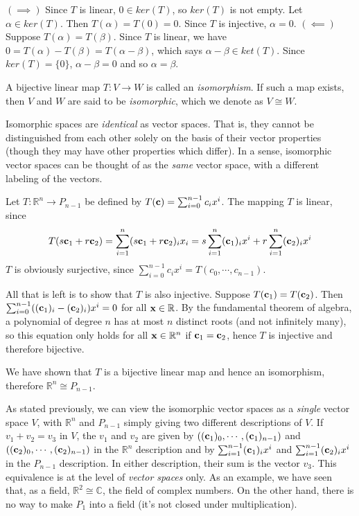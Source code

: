 \documentclass[12pt,letterpaper,reqno]{article}
\numberwithin{equation}{section}
\newcommand{\ti}[1]{\textit{#1}}
\begin{document}
\begin{pf}
$(\implies)$ Since $T$ is linear, $0 \in ker(T)$, so $ker(T)$ is not empty. Let $\alpha \in ker(T)$. Then $T(\alpha)=T(0)=0$. Since $T$ is injective, $\alpha=0$. $(\impliedby)$ Suppose $T(\alpha)=T(\beta)$. Since $T$ is linear, we have $0=T(\alpha)-T(\beta)=T(\alpha-\beta)$, which says $\alpha-\beta \in ket(T)$. Since $ker(T)=\{0\}$, $\alpha-\beta=0$ and so $\alpha=\beta$.	
\end{pf}

\begin{defn}[Isomorphism]
	A bijective linear map $T:V \to W$ is called an \ti{isomorphism}. If such a map exists, then $V$ and $W$ are said to be \ti{isomorphic}, which we denote as $V \cong W$.
\end{defn}

Isomorphic spaces are \ti{identical} as vector spaces. That is, they cannot be distinguished from each other solely on the basis of their vector properties (though they may have other properties which differ). In a sense, isomorphic vector spaces can be thought of as the \ti{same} vector space, with a different labeling of the vectors.

\begin{example}
Let $T:\mathbb{R}^n \to P_{n-1}$ be defined by $T({\bf c})=\sum_{i=0}^{n-1}c_ix^i$. The mapping $T$ is linear, since 
\begin{align*}
T(s{\bf c}_1+r{\bf c}_2)=\sum_{i=1}^n(s{\bf c}_1+r{\bf c}_2)_ix_i=s\sum_{i=1}^n({\bf c}_{1})_i x^i+r\sum_{i=1}^n({\bf c}_{2})_i x^i	
\end{align*}
$T$ is obviously surjective, since $\sum_{i=0}^{n-1}c_ix^i=T(c_0,\cdots,c_{n-1})$.

 All that is left is to show that $T$ is also injective. Suppose $T({\bf c}_1)=T({\bf c}_2)$. Then $\sum_{i=0}^{n-1}(({\bf c}_1)_i-({\bf c}_2)_i)x^i=0$ for all ${\bf x} \in \mathbb{R}$. By the fundamental theorem of algebra, a polynomial of degree $n$ has at most $n$ distinct roots (and not infinitely many), so this equation only holds for all ${\bf x} \in \mathbb{R}^n$ if ${\bf c}_1={\bf c}_2$, hence $T$ is injective and therefore bijective.
 
 We have shown that $T$ is a bijective linear map and hence an isomorphism, therefore $\mathbb{R}^n \cong P_{n-1}$.
 \end{example}
 
 As stated previously, we can view the isomorphic vector spaces as a \ti{single} vector space $V$, with $\mathbb{R}^n$ and $P_{n-1}$ simply giving two different descriptions of $V$. If $v_1+v_2=v_3$ in $V$, the $v_1$ and $v_2$ are given by $(({\bf c}_1)_0,\cdots,({\bf c}_1)_{n-1})$ and $(({\bf c} _2)_0,\cdots,({\bf c}_2)_{n-1})$ in the $\mathbb{R}^n$ description and by $\sum_{i=1}^{n-1}({\bf c}_1)_i x^i$ and $\sum_{i=1}^{n-1}({\bf c}_2)_i x^i$ in the $P_{n-1}$ description. In either description, their sum is the vector $v_3$. This equivalence is at the level of \ti{vector spaces} only. As an example, we have seen that, as a field, $\mathbb{R}^2 \cong \mathbb{C}$, the field of complex numbers. On the other hand, there is no way to make $P_{1}$ into a field (it's not closed under multiplication).
\end{document}
